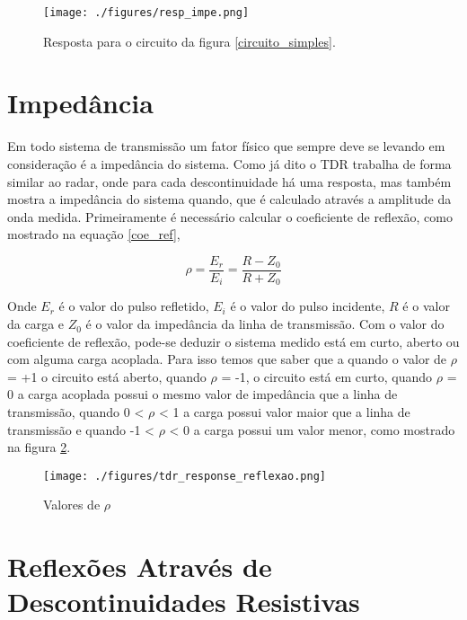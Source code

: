 \begin{figure}[htb!]
	\begin{center}
		\texttt{[image: ./figures/resp\_impe.png]}
		\caption{Resposta para o circuito da figura \ref{circuito_simples}.}
		\label{resp_imp}
	\end{center}	
\end{figure}



\section{Impedância}

Em todo sistema de transmissão um fator físico que sempre deve se levando em consideração é a impedância do sistema. Como já dito o TDR trabalha de forma similar ao radar, onde para cada descontinuidade há uma resposta, mas também mostra a impedância do sistema quando, que é calculado através a amplitude da onda medida. Primeiramente é necessário calcular o coeficiente de reflexão, como mostrado na equação \ref{coe_ref},

\begin{equation}
\rho = \frac{E_r}{E_i} = \frac{R - Z_0}{R + Z_0}
\label{coe_ref}
\end{equation}

Onde $E_r$ é o valor do pulso refletido, $E_i$ é o valor do pulso incidente, $R$ é o valor da carga e $Z_0$ é o valor da impedância da linha de transmissão. Com o valor do coeficiente de reflexão, pode-se deduzir o sistema medido está em curto, aberto ou com alguma carga acoplada. Para isso temos que saber que a quando o valor de $\rho$ = +1 o circuito está aberto, quando $\rho$ = -1, o circuito está em curto, quando $\rho$ = 0 a carga acoplada possui o mesmo valor de impedância que a linha de transmissão, quando 0 < $\rho$ < 1 a carga possui valor maior que a linha de transmissão e quando  -1 < $\rho$ < 0 a carga possui um valor menor, como mostrado na figura \ref{valor_rho}.

\begin{figure}[htb!]
	\begin{center}
		\texttt{[image: ./figures/tdr\_response\_reflexao.png]}
		\caption{Valores de $\rho$}
		\label{valor_rho}
	\end{center}
\end{figure}

\section{Reflexões Através de Descontinuidades Resistivas}

